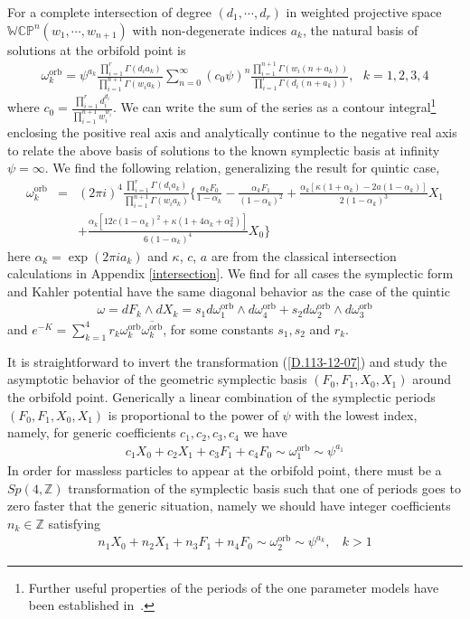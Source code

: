 \documentclass[12pt]{article}
\begin{document}
For a complete intersection of degree $(d_1,\cdots,d_r)$ in
weighted projective space $\mathbb{WCP}^n(w_1,\cdots,w_{n+1})$
with non-degenerate indices $a_k$, the natural basis of solutions
at the orbifold point is
\begin{eqnarray}
\omega_k^{\textrm{orb}}=\psi^{a_k}\frac{\prod_{i=1}^r\Gamma(d_ia_k)}{\prod_{i=1}^{n+1}\Gamma(w_ia_k)}
\sum_{n=0}^{\infty}(c_0\psi)^n\frac{\prod_{i=1}^{n+1}\Gamma(w_i(n+a_k))}{\prod_{i=1}^r\Gamma(d_i(n+a_k))},~~~
k=1,2,3,4
\end{eqnarray}
where
$c_0=\frac{\prod_{i=1}^rd_i^{d_i}}{\prod_{i=1}^{n+1}w_i^{w_i}}$.
We can write the sum of the series as a contour integral\footnote{Further useful
properties of the periods of the one parameter models have been established in~\cite{Lazaroiu:2000jx}. }
enclosing the positive real axis and analytically continue to the negative
real axis to relate the above basis of solutions to the known
symplectic basis at infinity $\psi=\infty$. We find the following
relation, generalizing the result for quintic case,
\begin{eqnarray} \label{D.113-12-07}
\omega_k^{\textrm{orb}}&=&(2\pi
i)^4\frac{\prod_{i=1}^r\Gamma(d_ia_k)}{\prod_{i=1}^{n+1}\Gamma(w_ia_k)}\{\frac{\alpha_k
F_0}{1-\alpha_k}-\frac{\alpha_k F_1}{(1-\alpha_k)^2}
+\frac{\alpha_k[\kappa(1+\alpha_k)-2a(1-\alpha_k)
]}{2(1-\alpha_k)^3}X_1 \nonumber \\
&& +\frac{\alpha_k[12c(1-\alpha_k)^2
+\kappa(1+4\alpha_k+\alpha_k^2)]}{6(1-\alpha_k)^4}X_0
  \}
\end{eqnarray}
here $\alpha_k=\exp(2\pi ia_k)$ and $\kappa$, $c$, $a$ are from
the classical intersection calculations in Appendix
\ref{intersection}. We find for all cases the symplectic form and
Kahler potential have the same diagonal behavior as the case of
the quintic
\begin{eqnarray}
\omega=dF_k\wedge dX_k=s_1 d\omega_1^{\textrm{orb}}\wedge
d\omega_4^{\textrm{orb}}+s_2 d\omega_2^{\textrm{orb}}\wedge
d\omega_3^{\textrm{orb}}
\end{eqnarray}
and $e^{-K}=\sum_{k=1}^4 r_k \omega_k^{\textrm{orb}}
\overline{\omega_k^{\textrm{orb}}}$, for some constants $s_1, s_2$
and $r_k$.

It is straightforward to invert the transformation
(\ref{D.113-12-07}) and study the asymptotic behavior of the
geometric symplectic basis $(F_0,F_1,X_0,X_1)$ around the orbifold
point. Generically a linear combination of the symplectic periods
$(F_0,F_1,X_0,X_1)$ is proportional to the power of $\psi$ with
the lowest index, namely, for generic coefficients $c_1, c_2, c_3,
c_4$ we have
\begin{eqnarray}
c_1X_0+c_2X_1+c_3F_1+c_4F_0\sim \omega_1^{\textrm{orb}}\sim
\psi^{a_1}
\end{eqnarray}
In order for massless particles to appear at the orbifold point,
there must be a $Sp(4,\mathbb{Z})$ transformation of the
symplectic basis such that one of periods goes to zero faster that
the generic situation, namely we should have integer coefficients $n_k\in \mathbb{Z}$
satisfying
\begin{eqnarray} \label{D.115}
n_1X_0+n_2X_1+n_3F_1+n_4F_0\sim \omega_2^{\textrm{orb}}\sim
\psi^{a_k},~~~~k>1
\end{eqnarray}
\end{document}
